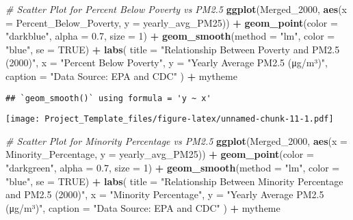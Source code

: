 \documentclass[
]{article}
\newenvironment{Shaded}{\begin{snugshade}}{\end{snugshade}}
\newcommand{\AttributeTok}[1]{\textcolor[rgb]{0.13,0.29,0.53}{#1}}
\newcommand{\CommentTok}[1]{\textcolor[rgb]{0.56,0.35,0.01}{\textit{#1}}}
\newcommand{\ConstantTok}[1]{\textcolor[rgb]{0.56,0.35,0.01}{#1}}
\newcommand{\DecValTok}[1]{\textcolor[rgb]{0.00,0.00,0.81}{#1}}
\newcommand{\FloatTok}[1]{\textcolor[rgb]{0.00,0.00,0.81}{#1}}
\newcommand{\FunctionTok}[1]{\textcolor[rgb]{0.13,0.29,0.53}{\textbf{#1}}}
\newcommand{\NormalTok}[1]{#1}
\newcommand{\SpecialCharTok}[1]{\textcolor[rgb]{0.81,0.36,0.00}{\textbf{#1}}}
\newcommand{\StringTok}[1]{\textcolor[rgb]{0.31,0.60,0.02}{#1}}
\begin{document}
\begin{Shaded}
\begin{Highlighting}[]
\CommentTok{\# Scatter Plot for Percent Below Poverty vs PM2.5}
\FunctionTok{ggplot}\NormalTok{(Merged\_2000, }\FunctionTok{aes}\NormalTok{(}\AttributeTok{x =}\NormalTok{ Percent\_Below\_Poverty, }\AttributeTok{y =}\NormalTok{ yearly\_avg\_PM25)) }\SpecialCharTok{+}
  \FunctionTok{geom\_point}\NormalTok{(}\AttributeTok{color =} \StringTok{"darkblue"}\NormalTok{, }\AttributeTok{alpha =} \FloatTok{0.7}\NormalTok{, }\AttributeTok{size =} \DecValTok{1}\NormalTok{) }\SpecialCharTok{+}
  \FunctionTok{geom\_smooth}\NormalTok{(}\AttributeTok{method =} \StringTok{"lm"}\NormalTok{, }\AttributeTok{color =} \StringTok{"blue"}\NormalTok{, }\AttributeTok{se =} \ConstantTok{TRUE}\NormalTok{) }\SpecialCharTok{+}
  \FunctionTok{labs}\NormalTok{(}
    \AttributeTok{title =} \StringTok{"Relationship Between Poverty and PM2.5 (2000)"}\NormalTok{,}
    \AttributeTok{x =} \StringTok{"Percent Below Poverty"}\NormalTok{,}
    \AttributeTok{y =} \StringTok{"Yearly Average PM2.5 (μg/m³)"}\NormalTok{,}
    \AttributeTok{caption =} \StringTok{"Data Source: EPA and CDC"}
\NormalTok{  ) }\SpecialCharTok{+}
\NormalTok{  mytheme}
\end{Highlighting}
\end{Shaded}

\begin{verbatim}
## `geom_smooth()` using formula = 'y ~ x'
\end{verbatim}

\texttt{[image: Project\_Template\_files/figure-latex/unnamed-chunk-11-1.pdf]}

\begin{Shaded}
\begin{Highlighting}[]
\CommentTok{\# Scatter Plot for Minority Percentage vs PM2.5}
\FunctionTok{ggplot}\NormalTok{(Merged\_2000, }\FunctionTok{aes}\NormalTok{(}\AttributeTok{x =}\NormalTok{ Minority\_Percentage, }\AttributeTok{y =}\NormalTok{ yearly\_avg\_PM25)) }\SpecialCharTok{+}
  \FunctionTok{geom\_point}\NormalTok{(}\AttributeTok{color =} \StringTok{"darkgreen"}\NormalTok{, }\AttributeTok{alpha =} \FloatTok{0.7}\NormalTok{, }\AttributeTok{size =} \DecValTok{1}\NormalTok{) }\SpecialCharTok{+}
  \FunctionTok{geom\_smooth}\NormalTok{(}\AttributeTok{method =} \StringTok{"lm"}\NormalTok{, }\AttributeTok{color =} \StringTok{"blue"}\NormalTok{, }\AttributeTok{se =} \ConstantTok{TRUE}\NormalTok{) }\SpecialCharTok{+}
  \FunctionTok{labs}\NormalTok{(}
    \AttributeTok{title =} \StringTok{"Relationship Between Minority Percentage and PM2.5 (2000)"}\NormalTok{,}
    \AttributeTok{x =} \StringTok{"Minority Percentage"}\NormalTok{,}
    \AttributeTok{y =} \StringTok{"Yearly Average PM2.5 (μg/m³)"}\NormalTok{,}
    \AttributeTok{caption =} \StringTok{"Data Source: EPA and CDC"}
\NormalTok{  ) }\SpecialCharTok{+}
\NormalTok{  mytheme}
\end{Highlighting}
\end{Shaded}
\end{document}
